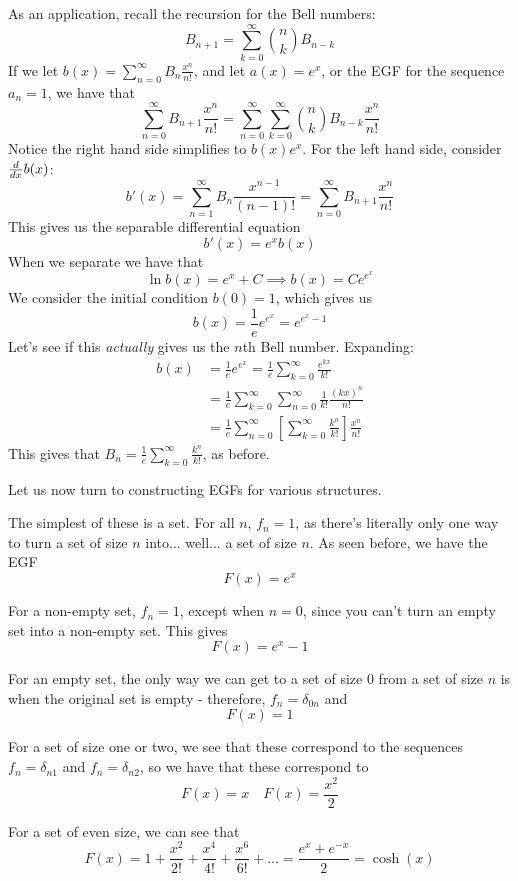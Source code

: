 \documentclass[11pt,twosided]{article}
\begin{document}
As an application, recall the recursion for the Bell numbers: 
\[
	B_{n+1} =  \sum_{k=0}^\infty \binom{n}{k} B_{n-k}
\]
If we let $b(x) = \sum_{n=0}^\infty B_n \frac{x^n}{n!}$, and let $a(x) = e^{x}$, or the EGF for the sequence $a_n = 1$, we have that
\[
	\sum_{n=0}^\infty B_{n+1} \frac{x^n}{n!} = \sum_{n=0}^\infty \sum_{k=0}^\infty \binom{n}{k}B_{n-k} \frac{x^n}{n!} 
\]
Notice the right hand side simplifies to $b(x) e^x$. For the left hand side, consider $\frac{d }{d x}b(x)$: 
\[
	b'(x) = \sum_{n=1}^\infty B_{n} \frac{x^{n-1}}{(n-1)!} = \sum_{n=0}^\infty B_{n+1} \frac{x^n}{n!}
\]
This gives us the separable differential equation
\[
	b'(x) = e^x b(x) 
\]
When we separate we have that 
\[
	\ln b(x) = e^x + C \implies b(x) = Ce^{e^x}
\]
We consider the initial condition $b(0) = 1$, which gives us 
\[
b(x) = \frac{1}{e} e^{e^x} = e^{e^x-1}
\]
Let's see if this \textit{actually} gives us the $n$th Bell number. Expanding: 
\begin{align*}
	b(x) &= \frac{1}{e} e^{e^x} = \frac{1}{e} \sum_{k=0}^\infty \frac{e^{kx}}{k!} \\
	&= \frac{1}{e} \sum_{k=0}^\infty \sum_{n=0}^\infty \frac{1}{k!} \frac{(kx)^n}{n!} \\
	&= \frac{1}{e} \sum_{n=0}^\infty \left[\sum_{k=0}^\infty \frac{k^n}{k!} \right] \frac{x^n}{n!}
\end{align*}
This gives that $B_n = \frac{1}{e} \sum_{k=0}^\infty \frac{k^n}{k!}$, as before. 

Let us now turn to constructing EGFs for various structures.

The simplest of these is a set. For all $n$, $f_n = 1$, as there's literally only one way to turn a set of size $n$ into... well... a set of size $n$. As seen before, we have the EGF 
\[
	F(x) = e^x
\]

For a non-empty set, $f_n = 1$, except when $n = 0$, since you can't turn an empty set into a non-empty set. This gives 
\[
	F(x) = e^x - 1
\]

For an empty set, the only way we can get to a set of size $0$ from a set of size $n$ is when the original set is empty - therefore, $f_n = \delta_{0n}$ and 
\[
	F(x) = 1
\]

For a set of size one or two, we see that these correspond to the sequences $f_n = \delta_{n1}$ and $f_n = \delta_{n2}$, so we have that these correspond to 
\[
	F(x) = x \quad F(x) = \frac{x^2}{2}
\]

For a set of even size, we can see that 
\[
	F(x) = 1 + \frac{x^2}{2!}  + \frac{x^4}{4!} + \frac{x^6}{6!} + \ldots = \frac{e^x + e^{-x}}{2} = \cosh(x)
\]
\end{document}
